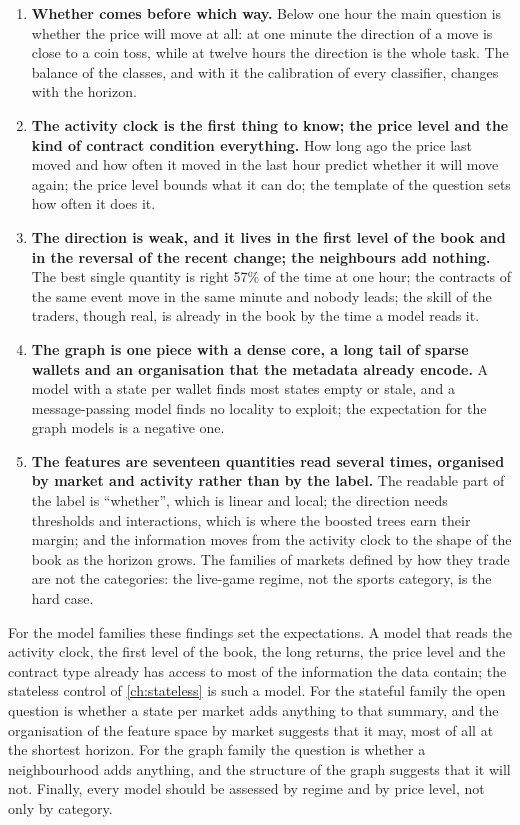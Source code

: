 \begin{enumerate}[leftmargin=*, itemsep=3pt]
\item \textbf{Whether comes before which way.}  Below one hour the main question is
whether the price will move at all: at one minute the direction of a move is close to a
coin toss, while at twelve hours the direction is the whole task.  The balance of the classes, and with it the
calibration of every classifier, changes with the horizon.
\item \textbf{The activity clock is the first thing to know; the price level and the kind
of contract condition everything.}  How long ago the price last moved and how often it
moved in the last hour predict whether it will move again; the price level bounds what it
can do; the template of the question sets how often it does it.
\item \textbf{The direction is weak, and it lives in the first level of the book and in
the reversal of the recent change; the neighbours add nothing.}  The best single quantity
is right 57\% of the time at one hour; the contracts of the same event move in the same
minute and nobody leads; the skill of the traders, though real, is already in the book by
the time a model reads it.
\item \textbf{The graph is one piece with a dense core, a long tail of sparse wallets and
an organisation that the metadata already encode.}  A model with a state per wallet finds
most states empty or stale, and a message-passing model finds no locality to exploit; the
expectation for the graph models is a negative one.
\item \textbf{The features are seventeen quantities read several times, organised by
market and activity rather than by the label.}  The readable part of the label is
``whether'', which is linear and local; the direction needs thresholds and interactions,
which is where the boosted trees earn their margin; and the information moves from the
activity clock to the shape of the book as the horizon grows.  The families of markets
defined by how they trade are not the categories: the live-game regime, not the sports
category, is the hard case.
\end{enumerate}

For the model families these findings set the expectations.  A model that reads the
activity clock, the first level of the book, the long returns, the price level and the
contract type already has access to most of the information the data contain; the
stateless control of \cref{ch:stateless} is such a model.  For the stateful family the
open question is whether a state per market adds anything to that summary, and the
organisation of the feature space by market suggests that it may, most of all at the
shortest horizon.  For the graph family the question is whether a neighbourhood adds
anything, and the structure of the graph suggests that it will not.  Finally, every model
should be assessed by regime and by price level, not only by category.
